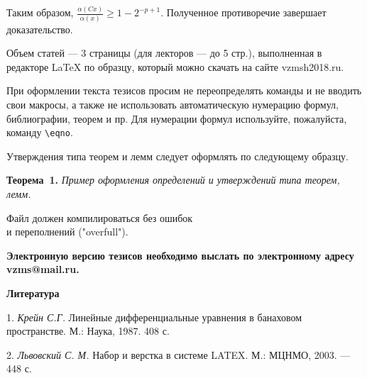 \documentclass[a5paper,12pt,openbib]{report}
\begin{document}
Таким образом,
$
	\frac{\alpha(Cx)}{\alpha(x)} \geq
	1-2^{-p+1}
$.
Полученное противоречие завершает доказательство.



Объем статей --- 3 страницы (для лекторов --- до 5 стр.),
выполненная в редакторе  LaTeX по  образцу, который можно скачать на
сайте vzmsh2018.ru.

При оформлении текста тезисов просим не  переопределять команды и не
вводить свои макросы, а также не использовать автоматическую
нумерацию формул, библиографии, теорем и пр. Для нумерации формул
используйте, пожалуйста, команду \verb"\eqno".

Утверждения типа теорем и лемм следует оформлять по следующему
образцу.

\textbf{Теорема~1.} {\it Пример оформления определений и утверждений
типа теорем, лемм.}

\begin{center}
Файл должен компилироваться без ошибок \\
и переполнений ("overfull").
\end{center}

\textbf{Электронную версию тезисов необходимо выслать  по
электронному адресу vzms@mail.ru.}

\smallskip \centerline{\bf Литература}\nopagebreak

1. {\it Крейн С.Г.} Линейные дифференциальные уравнения в банаховом пространстве. М.: Наука, 1987. 408 с.

2. {\it Львовский С. М.} Набор и верстка в системе LATEX. М.: МЦНМО, 2003. — 448 с.
\end{document}
